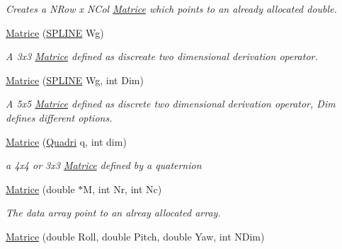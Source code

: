 \begin{DoxyCompactItemize}
\begin{DoxyCompactList}\small\item\em Creates a N\+Row x N\+Col \hyperlink{classMatrice}{Matrice} which points to an already allocated double. \end{DoxyCompactList}\item 
\hyperlink{classMatrice_a7f7c9cd8e95dbf5128eae712964b8acb}{Matrice} (\hyperlink{structSPLINE}{S\+P\+L\+I\+NE} Wg)\hypertarget{classMatrice_a7f7c9cd8e95dbf5128eae712964b8acb}{}\label{classMatrice_a7f7c9cd8e95dbf5128eae712964b8acb}

\begin{DoxyCompactList}\small\item\em A 3x3 \hyperlink{classMatrice}{Matrice} defined as discreate two dimensional derivation operator. \end{DoxyCompactList}\item 
\hyperlink{classMatrice_aaffb4cf7d6170d962a39afb0d30ae9cf}{Matrice} (\hyperlink{structSPLINE}{S\+P\+L\+I\+NE} Wg, int Dim)\hypertarget{classMatrice_aaffb4cf7d6170d962a39afb0d30ae9cf}{}\label{classMatrice_aaffb4cf7d6170d962a39afb0d30ae9cf}

\begin{DoxyCompactList}\small\item\em A 5x5 \hyperlink{classMatrice}{Matrice} defined as discrete two dimensional derivation operator, Dim defines different options. \end{DoxyCompactList}\item 
\hyperlink{classMatrice_aeb402ee1c3e83c9b7962e8f881c5d19f}{Matrice} (\hyperlink{classQuadri}{Quadri} q, int dim)
\begin{DoxyCompactList}\small\item\em a 4x4 or 3x3 \hyperlink{classMatrice}{Matrice} defined by a quaternion \end{DoxyCompactList}\item 
\hyperlink{classMatrice_a9d38a3b33a31d20d70fa1c87fa70319d}{Matrice} (double $\ast$M, int Nr, int Nc)\hypertarget{classMatrice_a9d38a3b33a31d20d70fa1c87fa70319d}{}\label{classMatrice_a9d38a3b33a31d20d70fa1c87fa70319d}

\begin{DoxyCompactList}\small\item\em The data array point to an alreay allocated array. \end{DoxyCompactList}\item 
\hyperlink{classMatrice_a0ef7999ffc3ba03dc67e3233b4465b85}{Matrice} (double Roll, double Pitch, double Yaw, int N\+Dim)\hypertarget{classMatrice_a0ef7999ffc3ba03dc67e3233b4465b85}{}\label{classMatrice_a0ef7999ffc3ba03dc67e3233b4465b85}


\end{DoxyCompactItemize}
